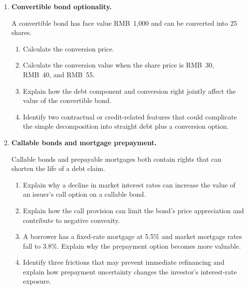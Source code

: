 \begin{enumerate}
\begin{enumerate}
\item Suppose the call option $\Delta$ rises to \(0.50\). Calculate the required hedge adjustment.

\item Explain how gamma creates the need for rebalancing and why a delta hedge may remain imperfect in practice.

\end{enumerate}

\item \textbf{Convertible bond optionality.}

A convertible bond has face value RMB~1,000 and can be converted into 25 shares.

\begin{enumerate}
\item Calculate the conversion price.

\item Calculate the conversion value when the share price is RMB~30, RMB~40, and RMB~55.

\item Explain how the debt component and conversion right jointly affect the value of the convertible bond.

\item Identify two contractual or credit-related features that could complicate the simple decomposition into straight debt plus a conversion option.

\end{enumerate}

\item \textbf{Callable bonds and mortgage prepayment.}

Callable bonds and prepayable mortgages both contain rights that can shorten the life of a debt claim.

\begin{enumerate}

\item Explain why a decline in market interest rates can increase the value of an issuer's call option on a callable bond.

\item Explain how the call provision can limit the bond's price appreciation and contribute to negative convexity.

\item A borrower has a fixed-rate mortgage at 5.5\% and market mortgage rates fall to 3.8\%. Explain why the prepayment option becomes more valuable.

\item Identify three frictions that may prevent immediate refinancing and explain how prepayment uncertainty changes the investor's interest-rate exposure.


\end{enumerate}
\end{enumerate}
